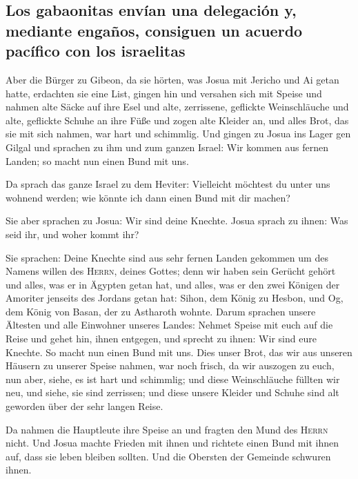 \hypertarget{los-gabaonitas-envuxedan-una-delegaciuxf3n-y-mediante-engauxf1os-consiguen-un-acuerdo-pacuxedfico-con-los-israelitas}{%
\subsection{Los gabaonitas envían una delegación y, mediante engaños,
consiguen un acuerdo pacífico con los
israelitas}\label{los-gabaonitas-envuxedan-una-delegaciuxf3n-y-mediante-engauxf1os-consiguen-un-acuerdo-pacuxedfico-con-los-israelitas}}

 Aber die Bürger zu Gibeon, da sie hörten, was Josua mit
Jericho und Ai getan hatte, erdachten sie eine List, 
gingen hin und versahen sich mit Speise und nahmen alte Säcke auf ihre
Esel  und alte, zerrissene, geflickte Weinschläuche und
alte, geflickte Schuhe an ihre Füße und zogen alte Kleider an, und alles
Brot, das sie mit sich nahmen, war hart und schimmlig. 
Und gingen zu Josua ins Lager gen Gilgal und sprachen zu ihm und zum
ganzen Israel: Wir kommen aus fernen Landen; so macht nun einen Bund mit
uns.

 Da sprach das ganze Israel zu dem Heviter: Vielleicht
möchtest du unter uns wohnend werden; wie könnte ich dann einen Bund mit
dir machen?

 Sie aber sprachen zu Josua: Wir sind deine Knechte. Josua
sprach zu ihnen: Was seid ihr, und woher kommt ihr?

 Sie sprachen: Deine Knechte sind aus sehr fernen Landen
gekommen um des Namens willen des \textsc{Herrn}, deines Gottes; denn
wir haben sein Gerücht gehört und alles, was er in Ägypten getan hat,
 und alles, was er den zwei Königen der Amoriter jenseits
des Jordans getan hat: Sihon, dem König zu Hesbon, und Og, dem König von
Basan, der zu Astharoth wohnte.  Darum sprachen unsere
Ältesten und alle Einwohner unseres Landes: Nehmet Speise mit euch auf
die Reise und gehet hin, ihnen entgegen, und sprecht zu ihnen: Wir sind
eure Knechte. So macht nun einen Bund mit uns.  Dies
unser Brot, das wir aus unseren Häusern zu unserer Speise nahmen, war
noch frisch, da wir auszogen zu euch, nun aber, siehe, es ist hart und
schimmlig;  und diese Weinschläuche füllten wir neu, und
siehe, sie sind zerrissen; und diese unsere Kleider und Schuhe sind alt
geworden über der sehr langen Reise.

 Da nahmen die Hauptleute ihre Speise an und fragten den
Mund des \textsc{Herrn} nicht.  Und Josua machte Frieden
mit ihnen und richtete einen Bund mit ihnen auf, dass sie leben bleiben
sollten. Und die Obersten der Gemeinde schwuren ihnen.

